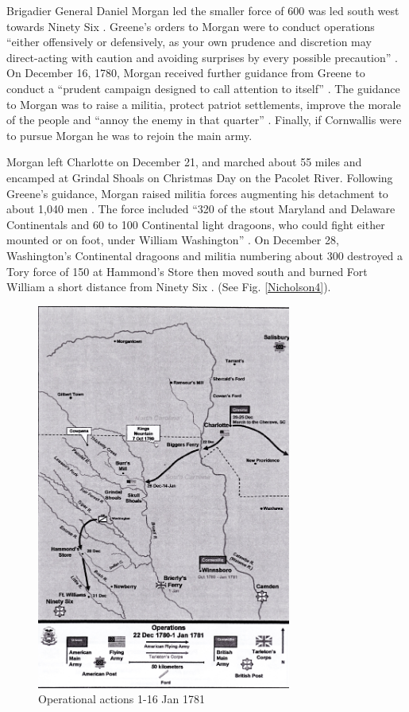 Brigadier General Daniel Morgan led the smaller force of 600 was led south west
towards Ninety Six \cite[p.27]{weigley_partisan_1970}.  Greene’s orders to Morgan were to
conduct operations “either offensively or defensively, as your own prudence and
discretion may direct-acting with caution and avoiding surprises by every
possible precaution” \cite[p.27]{weigley_partisan_1970}.  On December 16, 1780, Morgan
received further guidance from Greene to conduct a “prudent campaign designed to
call attention to itself” \cite[p.24]{moncure_cowpens_1996}.  The guidance to Morgan was to
raise a militia, protect patriot settlements, improve the morale of the people
and “annoy the enemy in that quarter” \cite[p.24]{moncure_cowpens_1996}.  Finally, if
Cornwallis were to pursue Morgan he was to rejoin the main army.  

Morgan left Charlotte on December 21, and marched about 55 miles and encamped at
Grindal Shoals on Christmas Day on the Pacolet River.  Following Greene’s
guidance, Morgan raised militia forces augmenting his detachment to about 1,040
men \cite[p.28]{weigley_partisan_1970}.   The force included “320 of the stout Maryland and
Delaware Continentals and 60 to 100 Continental light dragoons, who could fight
either mounted or on foot, under William Washington” \cite[p.28]{weigley_partisan_1970}.   On
December 28, Washington’s Continental dragoons and militia numbering about 300
destroyed a Tory force of 150 at Hammond’s Store then moved south and burned
Fort William a short distance from Ninety Six \cite[p.8]{babits_devil_2001}.
(See Fig. \ref{Nicholson4}).


\begin{figure}[h]
\begin{center}
\includegraphics[height=5in]{gfx/Nicholson5}
\end{center}
\caption{Operational actions 1-16 Jan 1781 \cite[Tab D, Map 7]{rauch_battle_2007}}
\label{Nicholson5}
\end{figure}


